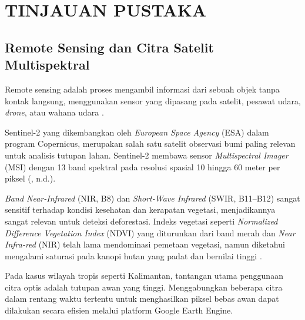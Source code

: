 
\chapter{TINJAUAN PUSTAKA}

\section{Remote Sensing dan Citra Satelit Multispektral}



Remote sensing adalah proses mengambil informasi dari sebuah objek tanpa kontak langsung, menggunakan sensor yang dipasang pada satelit, pesawat udara, \textit{drone}, atau wahana udara \citep{postWithanage, richards2022remote}.

Sentinel-2 yang dikembangkan oleh \textit{European Space Agency} (ESA) dalam program Copernicus, merupakan salah satu satelit observasi bumi paling relevan untuk analisis tutupan lahan. Sentinel-2 membawa sensor \textit{Multispectral Imager} (MSI) dengan 13 band spektral pada resolusi spasial 10 hingga 60 meter per piksel (\citeauthor{CopernicusSentinel2}, n.d.). 

\textit{Band Near-Infrared} (NIR, B8) dan \textit{Short-Wave Infrared} (SWIR, B11–B12) sangat sensitif terhadap kondisi kesehatan dan kerapatan vegetasi, menjadikannya sangat relevan untuk deteksi deforestasi. Indeks vegetasi seperti \textit{Normalized Difference Vegetation Index} (NDVI) yang diturunkan dari band merah dan \textit{Near Infra-red} (NIR) telah lama mendominasi pemetaan vegetasi, namun diketahui mengalami saturasi pada kanopi hutan yang padat dan bernilai tinggi \citep{chrysostomou2026srvi}. 

Pada kasus wilayah tropis seperti Kalimantan, tantangan utama penggunaan citra optis adalah tutupan awan yang tinggi. Menggabungkan beberapa citra dalam rentang waktu tertentu untuk menghasilkan piksel bebas awan dapat dilakukan secara efisien melalui platform Google Earth Engine.

